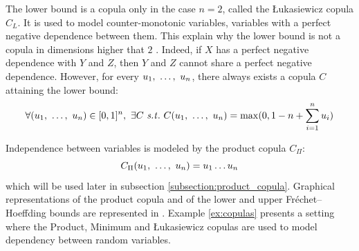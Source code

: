 The lower bound is a copula only in the case $n=2$, called the \L ukasiewicz copula $C_L$. It is used to model counter-monotonic variables, \ie variables with a perfect negative dependence between them. This explain why the lower bound is not a copula in dimensions higher that $2$ . Indeed, if $X$ has a perfect negative dependence with $Y$ and $Z$, then $Y$ and $Z$ cannot share a perfect negative dependence. However, for every $u_1, ~\dots, ~ u_n$, there always exists a copula $C$ attaining the lower bound:
\begin{eqnarray*}
    \forall (u_1\enum u_n)\in[0,1]^n,~\exists C \text{ \st }~C(u_1\enum u_n) = \max(0, 1-n+\sum_{i=1}^n u_i)
\end{eqnarray*}
 
Independence between variables is modeled by the product copula $C_\Pi$:
\begin{equation*}
    C_\Pi(u_1, ~\dots, ~ u_n)=u_1\dots u_n
\end{equation*}
which will be used later in subsection \ref{subsection:product_copula}. Graphical representations of the product copula and of the lower and upper Fréchet–Hoeffding bounds are represented in . Example \ref{ex:copulas} presents a setting where the Product, Minimum and \L ukasiewicz copulas are used to model dependency between random variables.

